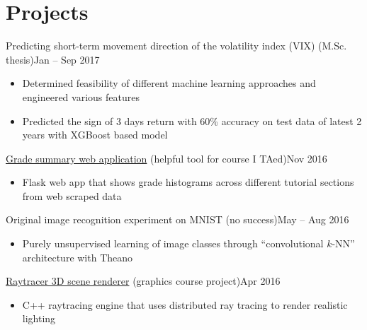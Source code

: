 \documentclass[10pt,letterpaper]{article}
\newcommand*\textmb[1]{\fontseries{b}\selectfont#1\fontseries{m}\selectfont}
\newcommand*\position[1]{\textmb{#1}}
\newcommand*\timespan\position
\begin{document}
\section*{Projects}
\position{Predicting short-term movement direction of the volatility index (VIX)} (M.Sc. thesis)\hfill\timespan{Jan -- Sep 2017}
\begin{itemize}
\item Determined feasibility of different machine learning approaches and engineered various features
\item Predicted the sign of 3 days return with 60\% accuracy on test data of latest 2 years with XGBoost based model
\end{itemize}
\position{\href{https://github.com/yumichael/blackboardlearn-statsview}{Grade summary web application}} (helpful tool for course I TAed)\hfill\timespan{Nov 2016}
\begin{itemize}
\item Flask web app that shows grade histograms across different tutorial sections from web scraped data
\end{itemize}
\position{Original image recognition experiment on MNIST} (no success)\hfill\timespan{May -- Aug 2016}
\begin{itemize}
\item Purely unsupervised learning of image classes through ``convolutional \(k\)-NN'' architecture with Theano
\end{itemize}
\position{\href{https://github.com/yumichael/raytrace}{Raytracer 3D scene renderer}} (graphics course project)\hfill\timespan{Apr 2016}
\begin{itemize}
\item C++ raytracing engine that uses distributed ray tracing to render realistic lighting
\end{itemize}
\end{document}
